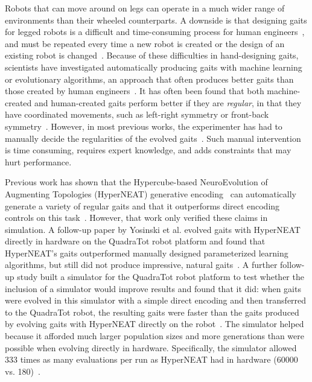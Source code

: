 
Robots that can move around on legs can operate in a much wider range of environments than their wheeled counterparts. A downside is that designing gaits for legged robots is a difficult and time-consuming process for human engineers~\cite{strom1999legged,wettergreen1992gait}, and must be repeated every time a new robot is created or the design of an existing robot is changed~\cite{hornby2005autonomous}. 
Because of these difficulties in hand-designing gaits, scientists have investigated automatically producing gaits with machine learning or evolutionary algorithms, an approach that often produces better gaits than those created by human engineers~\cite{valsalam:mii,kohl:stone,hornby2005autonomous,hornby2003generative,yos:clune}. It has often been found that both machine-created and human-created gaits perform better if they are \emph{regular}, in that they have coordinated movements, such as left-right symmetry or front-back symmetry~\cite{valsalam:mii,clune2011performance,clune2009evolving,clune2009sensitivity}.
However, in most previous works, the experimenter has had to manually decide the regularities of the evolved gaits~\cite{valsalam:mii,tellez,beer,raibert}. 
Such manual intervention is time consuming, requires expert knowledge, and adds constraints that may hurt performance. 

Previous work has shown that the Hypercube-based NeuroEvolution of Augmenting Topologies (HyperNEAT) generative encoding~\cite{stanley2009hypercube} can automatically generate a variety of regular gaits and that it outperforms direct encoding controls on this task~\cite{clune2009evolving,clune2011performance}.
However, that work only verified these claims in simulation. 
A follow-up paper by Yosinski et al. evolved gaits with HyperNEAT directly in hardware on the QuadraTot robot platform and found that HyperNEAT's gaits outperformed manually designed parameterized learning algorithms, but still did not produce impressive, natural gaits~\cite{yos:clune}. 
A further follow-up study built a simulator for the QuadraTot robot platform to test whether the inclusion of a simulator would improve results and found that it did:  when gaits were evolved in this simulator with a simple direct encoding and then transferred to the QuadraTot robot, the resulting gaits were faster than the gaits produced by evolving gaits with HyperNEAT directly on the robot~\cite{glette}. 
The simulator helped because it afforded much larger population sizes and more generations than were possible when evolving directly in hardware. Specifically, the simulator allowed 333 times as many evaluations per run as HyperNEAT had in hardware (60000 vs. 180)~\cite{yos:clune,glette}. 

